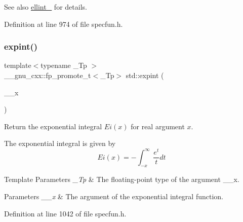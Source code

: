 \begin{DoxySeeAlso}{See also}
\hyperlink{group__tr29124__math__spec__func_gaac0240d1e7e401e652b9d1adf4c7e029}{ellint\+\_} for details. 
\end{DoxySeeAlso}


Definition at line 974 of file specfun.\+h.

\mbox{\label{group__tr29124__math__spec__func_ga0e9ac717a106ef54184b5f058c451782}} 
\subsubsection{\texorpdfstring{expint()}{expint()}}
{\footnotesize\ttfamily template$<$typename \+\_\+\+Tp $>$ \\
\+\_\+\+\_\+gnu\+\_\+cxx\+::fp\+\_\+promote\+\_\+t$<$\+\_\+\+Tp$>$ std\+::expint (\begin{DoxyParamCaption}\item[{\+\_\+\+Tp}]{\+\_\+\+\_\+x }\end{DoxyParamCaption})\hspace{0.3cm}{\ttfamily [inline]}}

Return the exponential integral $ Ei(x) $ for {\ttfamily real} argument $ x $.

The exponential integral is given by \[ Ei(x) = -\int_{-x}^\infty \frac{e^t}{t} dt \]


\begin{DoxyTemplParams}{Template Parameters}
{\em \+\_\+\+Tp} & The floating-\/point type of the argument {\ttfamily \+\_\+\+\_\+x}. \\
\hline
\end{DoxyTemplParams}

\begin{DoxyParams}{Parameters}
{\em \+\_\+\+\_\+x} & The argument of the exponential integral function. \\
\hline
\end{DoxyParams}


Definition at line 1042 of file specfun.\+h.

\mbox{\label{group__tr29124__math__spec__func_ga5842816f6eed2594e0a327df4e4a2a47}} 
